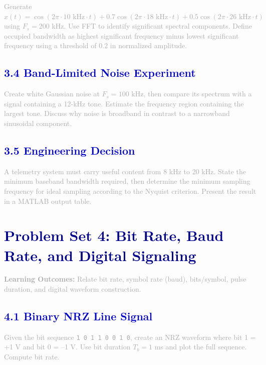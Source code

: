 \documentclass[12pt,a4paper]{article}
\begin{document}
\textcolor{darkgray}{
Generate $x(t) = \cos(2\pi \cdot 10 \text{ kHz} \cdot t) + 0.7 \cos(2\pi \cdot 18 \text{ kHz} \cdot t) + 0.5 \cos(2\pi \cdot 26 \text{ kHz} \cdot t)$ using $F_s = 200$ kHz. Use FFT to identify significant spectral components. Define occupied bandwidth as highest significant frequency minus lowest significant frequency using a threshold of 0.2 in normalized amplitude.
}

\subsection*{\large\textbf{\textcolor{mediumblue}{3.4 Band-Limited Noise Experiment}}}

\textcolor{darkgray}{
Create white Gaussian noise at $F_s = 100$ kHz, then compare its spectrum with a signal containing a 12-kHz tone. Estimate the frequency region containing the largest tone. Discuss why noise is broadband in contrast to a narrowband sinusoidal component.
}

\subsection*{\large\textbf{\textcolor{mediumblue}{3.5 Engineering Decision}}}

\textcolor{darkgray}{
A telemetry system must carry useful content from 8 kHz to 20 kHz. State the minimum baseband bandwidth required, then determine the minimum sampling frequency for ideal sampling according to the Nyquist criterion. Present the result in a MATLAB output table.
}

\newpage

\section*{\LARGE\textbf{\textcolor{darkblue}{Problem Set 4: Bit Rate, Baud Rate, and Digital Signaling}}}

\textcolor{darkgray}{\textbf{Learning Outcomes:} Relate bit rate, symbol rate (baud), bits/symbol, pulse duration, and digital waveform construction.}

\subsection*{\large\textbf{\textcolor{mediumblue}{4.1 Binary NRZ Line Signal}}}

\textcolor{darkgray}{
Given the bit sequence \texttt{1 0 1 1 0 0 1 0}, create an NRZ waveform where bit 1 = +1 V and bit 0 = --1 V. Use bit duration $T_b = 1$ ms and plot the full sequence. Compute bit rate.
}
\end{document}
